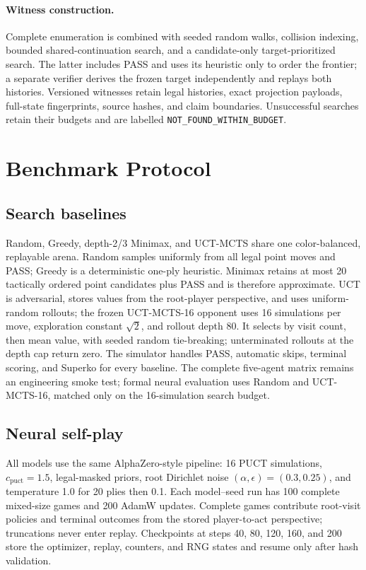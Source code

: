 \documentclass[10pt,letterpaper]{article}
\begin{document}
\paragraph{Witness construction.}
Complete enumeration is combined with seeded random walks, collision indexing,
bounded shared-continuation search, and a candidate-only target-prioritized
search. The latter includes PASS and uses its heuristic only to order the
frontier; a separate verifier derives the frozen target independently and
replays both histories. Versioned witnesses retain legal histories, exact
projection payloads, full-state fingerprints, source hashes, and claim
boundaries. Unsuccessful searches retain their budgets and are labelled
\texttt{NOT\_FOUND\_WITHIN\_BUDGET}.

\section{Benchmark Protocol}
\label{sec:protocol}

\subsection{Search baselines}

Random, Greedy, depth-2/3 Minimax, and UCT-MCTS share one color-balanced,
replayable arena. Random samples uniformly from all legal point moves and PASS;
Greedy is a deterministic one-ply heuristic. Minimax retains at most 20
tactically ordered point candidates plus PASS and is therefore approximate.
UCT is adversarial, stores values from the root-player perspective, and uses
uniform-random rollouts; the frozen UCT-MCTS-16 opponent uses 16 simulations
per move, exploration constant $\sqrt{2}$, and rollout depth 80. It selects by
visit count, then mean value, with seeded random tie-breaking; unterminated
rollouts at the depth cap return zero. The simulator handles PASS, automatic
skips, terminal scoring, and Superko for every baseline. The complete
five-agent matrix remains an engineering smoke test; formal neural evaluation
uses Random and UCT-MCTS-16, matched only on the 16-simulation search budget.

\subsection{Neural self-play}

All models use the same AlphaZero-style pipeline: 16 PUCT simulations,
$c_{\mathrm{puct}}=1.5$, legal-masked priors, root Dirichlet noise
$(\alpha,\epsilon)=(0.3,0.25)$, and temperature 1.0 for 20 plies then 0.1.
Each model--seed run has 100 complete mixed-size games and 200 AdamW updates.
Complete games contribute root-visit policies and terminal outcomes from the
stored player-to-act perspective; truncations never enter replay. Checkpoints
at steps 40, 80, 120, 160, and 200 store the optimizer, replay, counters, and
RNG states and resume only after hash validation.
\end{document}
